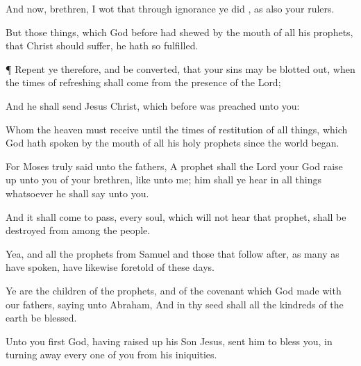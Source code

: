 {And
now,
brethren, I
wot
that
through
ignorance ye
did
{},
as
{}
also
your
rulers.

But those
things,
which
God before had
shewed
by the
mouth of
all
his
prophets,
that
Christ should
suffer, he
hath
so
fulfilled.


\par }{\PP {}¶ Repent
ye
therefore,
and be
converted,
that
your
sins may be blotted
out,
when the
times of
refreshing shall
come
from the
presence of the
Lord;

And he shall
send
Jesus
Christ, which before was
preached unto
you:

Whom the
heaven
must
receive
until the
times of
restitution of all
things,
which
God hath
spoken
by the
mouth of
all
his
holy
prophets
since the world
began.

For
Moses
truly
said
unto the
fathers, A
prophet
shall the
Lord
your
God raise
up unto
you
of
your
brethren, like
unto
me;
him shall ye
hear
in all
things
whatsoever he shall
say
unto
you.

And it shall come to
pass,
{}
every
soul,
which
will
not
hear
that
prophet, shall be
destroyed
from among the
people.

Yea,
and
all the
prophets
from
Samuel
and those that follow
after, as many
as have
spoken,
have
likewise
foretold
of
these
days.

Ye
are the
children of the
prophets,
and of the
covenant
which
God
made
with
our
fathers,
saying
unto
Abraham,
And
in
thy
seed
shall
all the
kindreds of the
earth be
blessed.

Unto
you
first
God, having raised
up
his
Son
Jesus,
sent
him to
bless
you,
in turning
away every one of
you
from
his
iniquities.




\par }
